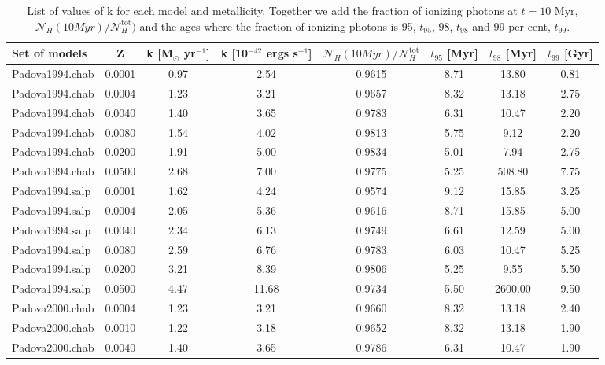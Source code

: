\documentclass[12pt,letterpaper,usenatbib,useAMS]{article}
\begin{document}
\begin{table}
    \centering
    \resizebox{\columnwidth}{!} {
    \begin{threeparttable}
        \caption{List of values of k for each model and metallicity. Together we add the fraction of ionizing photons at $t=10$ Myr, $\mathcal{N}_H(10Myr)/\mathcal{N}_H^{\mathrm{tot}})$ and the ages where the fraction of ionizing photons is 95, $t_{95}$, 98, $t_{98}$ and 99 per cent, $t_{99}$.}
        \begin{tabular}{l|c|c|c|c|c|c|c}
            \hline
            Set of models & Z & k [M$_\odot$ yr$^{-1}$] & k [10$^{-42}$ ergs s$^{-1}$] & $\mathcal{N}_H(10Myr)/\mathcal{N}_H^{\mathrm{tot}}$ & $t_{95}$ [Myr] & $t_{98}$ [Myr] & $t_{99}$ [Gyr] \\
            \hline
            \hline
            Padova1994.chab & 0.0001 & 0.97 & 2.54 & 0.9615 & 8.71 & 13.80 & 0.81 \\
            Padova1994.chab & 0.0004 & 1.23 & 3.21 & 0.9657 & 8.32 & 13.18 & 2.75 \\
            Padova1994.chab & 0.0040 & 1.40 & 3.65 & 0.9783 & 6.31 & 10.47 & 2.20 \\
            Padova1994.chab & 0.0080 & 1.54 & 4.02 & 0.9813 & 5.75 & 9.12 & 2.20 \\
            Padova1994.chab & 0.0200 & 1.91 & 5.00 & 0.9834 & 5.01 & 7.94 & 2.75 \\
            Padova1994.chab & 0.0500 & 2.68 & 7.00 & 0.9775 & 5.25 & 508.80 & 7.75 \\
            Padova1994.salp & 0.0001 & 1.62 & 4.24 & 0.9574 & 9.12 & 15.85 & 3.25 \\
            Padova1994.salp & 0.0004 & 2.05 & 5.36 & 0.9616 & 8.71 & 15.85 & 5.00 \\
            Padova1994.salp & 0.0040 & 2.34 & 6.13 & 0.9749 & 6.61 & 12.59 & 5.00 \\
            Padova1994.salp & 0.0080 & 2.59 & 6.76 & 0.9783 & 6.03 & 10.47 & 5.25 \\
            Padova1994.salp & 0.0200 & 3.21 & 8.39 & 0.9806 & 5.25 & 9.55 & 5.50 \\
            Padova1994.salp & 0.0500 & 4.47 & 11.68 & 0.9734 & 5.50 & 2600.00 & 9.50 \\
            Padova2000.chab & 0.0004 & 1.23 & 3.21 & 0.9660 & 8.32 & 13.18 & 2.40 \\
            Padova2000.chab & 0.0010 & 1.22 & 3.18 & 0.9652 & 8.32 & 13.18 & 1.90 \\
            Padova2000.chab & 0.0040 & 1.40 & 3.65 & 0.9786 & 6.31 & 10.47 & 1.90 \\

\end{tabular}
\end{threeparttable}}
\end{table}
\end{document}

